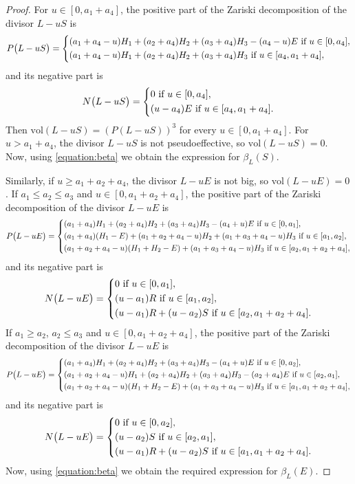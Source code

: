 \documentclass[12pt]{amsart}
\theoremstyle{definition}
\theoremstyle{remark}
\begin{document}
\begin{proof}
For $u\in[0,a_1+a_4]$, the positive part of the Zariski decomposition of the divisor $L-uS$ is
$$
P\big(L-uS\big)=\left\{\aligned
&(a_1+a_4-u)H_1+(a_2+a_4)H_2+(a_3+a_4)H_3-(a_4-u)E\ \text{if $u\in[0,a_4]$},\\
&(a_1+a_4-u)H_1+(a_2+a_4)H_2+(a_3+a_4)H_3\ \text{if $u\in[a_4,a_1+a_4]$},
\endaligned
\right.
$$
and its negative part is
$$
N\big(L-uS\big)=\left\{\aligned
&0\ \text{if $u\in[0,a_4]$},\\
&(u-a_4)E\ \text{if $u\in[a_4,a_1+a_4]$}.
\endaligned
\right.
$$
Then $\mathrm{vol}(L-uS)=(P(L-uS))^3$ for every $u\in[0,a_1+a_4]$.
For $u>a_1+a_4$, the divisor $L-uS$ is not pseudoeffective, so $\mathrm{vol}(L-uS)=0$.
Now, using \eqref{equation:beta} we obtain the expression for $\beta_L(S)$.

Similarly, if $u\geqslant a_1+a_2+a_4$, the divisor $L-uE$ is not big, so $\mathrm{vol}(L-uE)=0$.
If $a_1\leqslant a_2\leqslant a_3$ and $u\in[0,a_1+a_2+a_4]$, the positive part of the Zariski decomposition of the divisor $L-uE$ is
$$
P\big(L-uE\big)=\left\{\aligned
&(a_1+a_4)H_1+(a_2+a_4)H_2+(a_3+a_4)H_3-(a_4+u)E\ \text{if $u\in[0,a_1]$},\\
&(a_1+a_4)(H_1-E)+(a_1+a_2+a_4-u)H_2+(a_1+a_3+a_4-u)H_3\ \text{if $u\in[a_1,a_2]$},\\
&(a_1+a_2+a_4-u)(H_1+H_2-E)+(a_1+a_3+a_4-u)H_3\ \text{if $u\in[a_2,a_1+a_2+a_4]$},
\endaligned
\right.
$$
and its negative part is
$$
N\big(L-uE\big)=\left\{\aligned
&0\ \text{if $u\in[0,a_1]$},\\
&(u-a_1)R\ \text{if $u\in[a_1,a_2]$},\\
&(u-a_1)R+(u-a_2)S\ \text{if $u\in[a_2,a_1+a_2+a_4]$}.
\endaligned
\right.
$$
If $a_1\geqslant a_2$, $a_2\leqslant a_3$ and $u\in[0,a_1+a_2+a_4]$, the positive part of the Zariski decomposition of the divisor $L-uE$ is
$$
P\big(L-uE\big)=\left\{\aligned
&(a_1+a_4)H_1+(a_2+a_4)H_2+(a_3+a_4)H_3-(a_4+u)E\ \text{if $u\in[0,a_2]$},\\
&(a_1+a_2+a_4-u)H_1+(a_2+a_4)H_2+(a_3+a_4)H_3-(a_2+a_4)E\ \text{if $u\in[a_2,a_1]$},\\
&(a_1+a_2+a_4-u)(H_1+H_2-E)+(a_1+a_3+a_4-u)H_3\ \text{if $u\in[a_1,a_1+a_2+a_4]$},
\endaligned
\right.
$$
and its negative part is
$$
N\big(L-uE\big)=\left\{\aligned
&0\ \text{if $u\in[0,a_2]$},\\
&(u-a_2)S\ \text{if $u\in[a_2,a_1]$},\\
&(u-a_1)R+(u-a_2)S\ \text{if $u\in[a_1,a_1+a_2+a_4]$}.
\endaligned
\right.
$$
Now, using \eqref{equation:beta} we obtain the required expression for $\beta_L(E)$.
\end{proof}
\end{document}
